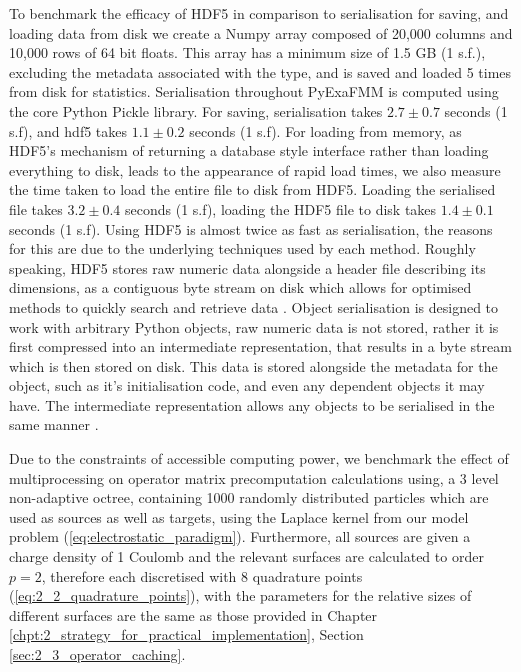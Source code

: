 To benchmark the efficacy of HDF5 in comparison to serialisation for saving,
and loading data from disk we create a Numpy array composed of
20,000 columns and 10,000 rows of 64 bit floats. This array has a minimum size
of 1.5 GB (1 s.f.), excluding the metadata associated with the type, and is
saved and loaded 5 times from disk for statistics. Serialisation throughout
\gls{PyExaFMM} is computed using the core Python Pickle library. For saving,
serialisation takes $2.7 \pm 0.7$ seconds (1 s.f), and hdf5 takes $1.1 ± 0.2$ seconds (1 s.f).
For loading from memory, as HDF5's mechanism of returning a database style interface
rather than loading everything to disk, leads to the appearance of rapid
load times, we also measure the time taken to load the entire file to disk from
HDF5. Loading the serialised file takes $3.2 \pm 0.4$ seconds (1 s.f), loading
the HDF5 file to disk takes $1.4 \pm 0.1$ seconds (1 s.f). Using HDF5 is almost
twice as fast as serialisation, the reasons for this are due to the underlying
techniques used by each method. Roughly speaking, HDF5 stores raw numeric data
alongside a header file describing its dimensions, as a contiguous byte stream
on disk which allows for optimised methods to quickly search and retrieve data
\cite{collette2013python}. Object serialisation is designed to work with arbitrary
Python objects, raw numeric data is not stored, rather it is first compressed
into an intermediate representation, that results in a byte stream which is then
stored on disk. This data is stored alongside the metadata for the object, such
as it's initialisation code, and even any dependent objects it may have. The
intermediate representation allows any objects to be serialised in the same
manner \cite{pickle}.

Due to the constraints of accessible computing power, we benchmark the effect of
multiprocessing on operator matrix precomputation calculations using, a 3 level
non-adaptive octree, containing 1000 randomly distributed
particles which are used as sources as well as targets, using the Laplace kernel
from our model problem (\ref{eq:electrostatic_paradigm}). Furthermore, all
sources are given a charge density of 1 Coulomb and the relevant surfaces
are calculated to order $p=2$, therefore each discretised with $8$ quadrature points
(\ref{eq:2_2_quadrature_points}), with the parameters for the relative sizes
of different surfaces are the same as those provided
in Chapter \ref{chpt:2_strategy_for_practical_implementation},
Section \ref{sec:2_3_operator_caching}.

